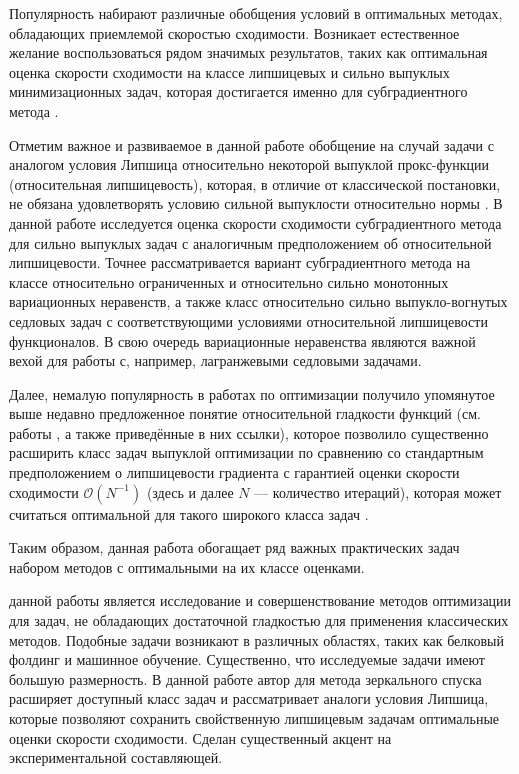 Популярность набирают различные обобщения условий в оптимальных методах, обладающих приемлемой скоростью сходимости. Возникает естественное желание воспользоваться рядом значимых результатов, таких как оптимальная оценка скорости сходимости на классе липшицевых и сильно выпуклых минимизационных задач, которая достигается именно для субградиентного метода \cite{Bach_2012}. 

Отметим важное и развиваемое в данной работе обобщение на случай задачи с аналогом условия Липшица относительно некоторой выпуклой прокс-функции (относительная липшицевость), которая, в отличие от классической постановки, не обязана удовлетворять условию сильной выпуклости относительно нормы \cite{AdaMirr_2021,Lu_2018,Zhou_NIPS_2020}. В данной работе исследуется оценка скорости сходимости субградиентного метода для сильно выпуклых задач с аналогичным предположением об относительной липшицевости. Точнее рассматривается вариант субградиентного метода на классе относительно ограниченных и относительно сильно монотонных вариационных неравенств, а также класс относительно сильно выпукло-вогнутых седловых задач с соответствующими условиями относительной липшицевости функционалов. В свою очередь вариационные неравенства являются важной вехой для работы с, например, лагранжевыми седловыми задачами. 

Далее, немалую популярность в работах по оптимизации получило упомянутое выше недавно предложенное понятие относительной гладкости функций (см. работы \cite{Bauschke,Drag,Dragomir,Lu_Nesterov_2018}, а также приведённые в них ссылки), которое позволило существенно расширить класс задач выпуклой оптимизации по сравнению со стандартным предположением о липшицевости градиента с гарантией оценки скорости сходимости $\mathcal{O}(N^{-1})$ (здесь и далее $N$ --- количество итераций), которая может считаться оптимальной для такого широкого класса задач \cite{Dragomir}. 

Таким образом, данная работа обогащает ряд важных практических задач набором методов с оптимальными на их классе оценками.


{\aim} данной работы является исследование и совершенствование методов оптимизации для задач, не обладающих достаточной гладкостью для применения классических методов. Подобные задачи возникают в различных областях, таких как белковый фолдинг и машинное обучение. Существенно, что исследуемые задачи имеют большую размерность. В данной работе автор для метода зеркального спуска расширяет доступный класс задач и рассматривает аналоги условия Липшица, которые позволяют сохранить свойственную липшицевым задачам оптимальные оценки скорости сходимости. Сделан существенный акцент на экспериментальной составляющей.

